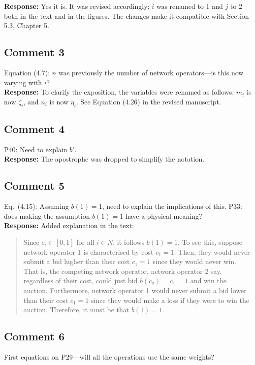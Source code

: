\documentclass[10pt,a4paper,notitlepage]{article}
\numberwithin{equation}{section}
\begin{document}
\textbf{Response:}
Yes it is. It was revised accordingly; $i$ was renamed to 1 and $j$ to 2 both in the text and in the figures. The changes make it compatible with Section 5.3, Chapter 5.

\subsection{Comment 3}
Equation (4.7): $n$ was previously the number of network operators---is this now varying with $i$?\\[-2ex]

\textbf{Response:}
To clarify the exposition, the variables were renamed as follows: $m_i$ is now $\zeta_i$, and $n_i$ is now $\eta_i$. See Equation (4.26) in the revised manuscript.

\subsection{Comment 4}
P40: Need to explain $b'$.\\[-2ex]

\textbf{Response:}
The apostrophe was dropped to simplify the notation.

\subsection{Comment 5}
Eq.~(4.15): Assuming $b(1) = 1$, need to explain the implications of this. P33: does making the assumption $b(1)=1$ have a physical meaning?\\[-2ex]

\textbf{Response:}
Added explanation in the text:
\begin{quote}
Since $c_i\in [0,1]$ for all $i\in N$, it follows $b(1) = 1$. To see this, suppose network operator 1 is characterised by cost $c_1 = 1$. Then, they would never submit a bid higher than their cost $c_1 = 1$ since they would never win. That is, the competing network operator, network operator 2 say, regardless of their cost, could just bid $b(c_2) = c_1 = 1$ and win the auction. Furthermore, network operator 1 would never submit a bid lower than their cost $c_1 = 1$ since they would make a loss if they were to win the auction. Therefore, it must be that $b(1) = 1$.
\end{quote}

\subsection{Comment 6}
First equations on P29---will all the operations use the same weights?\\[-2ex]
\end{document}
